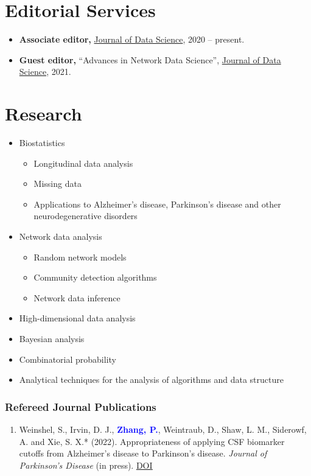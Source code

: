 \documentclass{res}
\newcommand{\PZnot}{\textbf{\textcolor{blue}{Zhang, P.}}}
\begin{document}
\begin{resume}
\section{Editorial Services}
\begin{itemize}
	\item \textbf{Associate editor,} 
	\href{https://jds-online.org/journal/JDS}{Journal of Data 
		Science}, 2020 -- present.
	\item \textbf{Guest editor,} ``Advances in Network Data 
	Science'', \href{https://jds-online.org/journal/JDS}{Journal of 
		Data Science}, 2021.
\end{itemize}
	
\section{Research}
\begin{itemize}
	\item Biostatistics
	\begin{itemize}
		\item Longitudinal data analysis
		\item Missing data
		\item Applications to Alzheimer's disease, Parkinson's 
		disease and other neurodegenerative disorders
	\end{itemize}
	\item Network data analysis
	\begin{itemize}
		\item Random network models
		\item Community detection algorithms
		\item Network data inference
	\end{itemize}
	\item High-dimensional data analysis 
	\item Bayesian analysis
	\item Combinatorial probability
	\item Analytical techniques for the analysis of algorithms and 
	data structure
\end{itemize}

\subsubsection{Refereed Journal Publications}
\begin{enumerate}
	\item {\sc Weinshel, S., Irvin, D. J.,} \PZnot, {\sc Weintraub, 
	D., Shaw, L. M., Siderowf, A. and Xie, S. X.*} (2022). 
	Appropriateness of applying CSF biomarker cutoffs from 
	Alzheimer’s disease to Parkinson’s disease. {\em Journal of 
	Parkinson's Disease} (in press). 
	\href{https://doi.org/10.3233/JPD-212989}{\underline{DOI}} 
	

\end{enumerate}
\end{resume}
\end{document}
